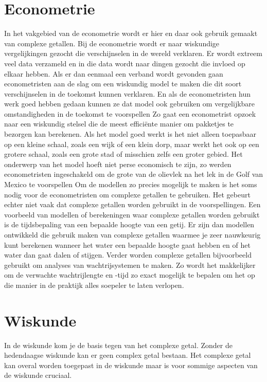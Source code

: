 \documentclass[11pt,fleqn]{book} %
\begin{document}
\section{Econometrie}
In het vakgebied van de econometrie wordt er hier en daar ook gebruik gemaakt van complexe getallen. Bij de econometrie wordt er naar wiskundige vergelijkingen gezocht die verschijnselen in de wereld verklaren. Er wordt extreem veel data verzameld en in die data wordt naar dingen gezocht die invloed op elkaar hebben. Als er dan eenmaal een verband wordt gevonden gaan econometristen aan de slag om een wiskundig model te maken die dit soort verschijnselen in de toekomst kunnen verklaren. En als de econometristen hun werk goed hebben gedaan kunnen ze dat model ook gebruiken om vergelijkbare omstandigheden in de toekomst te voorspellen
Zo gaat een econometrist opzoek naar een wiskundig stelsel die de meest efficiënte manier om pakketjes te bezorgen kan berekenen. Als het model goed werkt is het niet alleen toepasbaar op een kleine schaal, zoals een wijk of een klein dorp, maar werkt het ook op een grotere schaal, zoals een grote stad of misschien zelfs een groter gebied. Het onderwerp van het model hoeft niet perse economisch te zijn, zo werden econometristen ingeschakeld om de grote van de olievlek na het lek in de Golf van Mexico te voorspellen
Om de modellen zo precies mogelijk te maken is het soms nodig voor de econometristen om complexe getallen te gebruiken. Het gebeurt echter niet vaak dat complexe getallen worden gebruikt in de voorspellingen. Een voorbeeld van modellen of berekeningen waar complexe getallen worden gebruikt is de tijdsbepaling van een bepaalde hoogte van een getij. Er zijn dan modellen ontwikkeld die gebruik maken van complexe getallen waarmee je zeer nauwkeurig kunt berekenen wanneer het water een bepaalde hoogte gaat hebben en of het water dan gaat dalen of stijgen. Verder worden complexe getallen bijvoorbeeld gebruikt om analyses van wachtrijsystemen te maken. Zo wordt het makkelijker om de verwachte wachtrijlengte en -tijd zo exact mogelijk te bepalen om het op die manier in de praktijk alles soepeler te laten verlopen.

\section{Wiskunde}
In de wiskunde kom je de basis tegen van het complexe getal. Zonder de hedendaagse wiskunde kan er geen complex getal bestaan. Het complexe getal kan overal worden toegepast in de wiskunde maar is voor sommige aspecten van de wiskunde cruciaal. 
\end{document}
